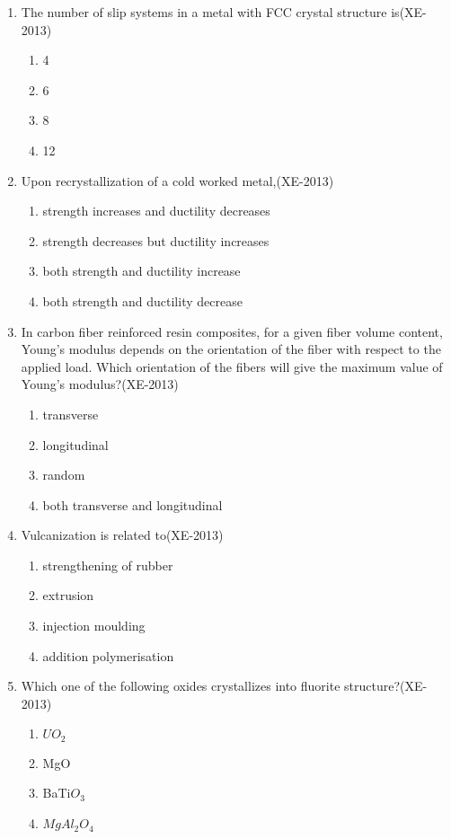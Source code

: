\documentclass[journal]{IEEEtran}
\numberwithin{equation}{enumi}
\numberwithin{figure}{enumi}
\begin{document}
\begin{enumerate}
\begin{enumerate}
\end{enumerate}
\item The number of slip systems in a metal with FCC crystal structure is\hfill(XE-2013)
\begin{enumerate}
    \item 4
    \item 6
    \item 8
    \item 12
\end{enumerate}
\item Upon recrystallization of a cold worked metal,\hfill(XE-2013)
\begin{enumerate}
    \item strength increases and ductility decreases
    \item strength decreases but ductility increases
    \item both strength and ductility increase
    \item both strength and ductility decrease
\end{enumerate}
\item In carbon fiber reinforced resin composites, for a given fiber volume content, Young's modulus depends on the orientation of the fiber with respect to the applied load. Which orientation of the fibers will give the maximum value of Young's modulus?\hfill(XE-2013)
\begin{enumerate}
    \item transverse 
    \item longitudinal
    \item random 
    \item both transverse and longitudinal
\end{enumerate}
\item Vulcanization is related to\hfill(XE-2013)
\begin{enumerate}
    \item strengthening of rubber 
    \item extrusion
    \item injection moulding 
    \item addition polymerisation
\end{enumerate}
\item Which one of the following oxides crystallizes into fluorite structure?\hfill(XE-2013)
\begin{enumerate}
    \item $UO_2$
    \item MgO
    \item BaTi$O_3$
    \item $MgAl_2O_4$
\end{enumerate}
\end{enumerate}
\end{document}
